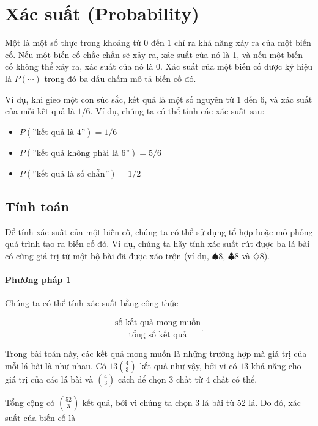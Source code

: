 \chapter{Xác suất (Probability)}


Một  là một số thực trong khoảng từ $0$ đến $1$
chỉ ra khả năng xảy ra của một biến cố.
Nếu một biến cố chắc chắn sẽ xảy ra,
xác suất của nó là 1,
và nếu một biến cố không thể xảy ra,
xác suất của nó là 0.
Xác suất của một biến cố được ký hiệu là $P(\cdots)$
trong đó ba dấu chấm mô tả biến cố đó.

Ví dụ, khi gieo một con súc sắc,
kết quả là một số nguyên từ $1$ đến $6$,
và xác suất của mỗi kết quả là $1/6$.
Ví dụ, chúng ta có thể tính các xác suất sau:

\begin{itemize}[noitemsep]
\item $P(\textrm{''kết quả là 4''})=1/6$
\item $P(\textrm{''kết quả không phải là 6''})=5/6$
\item $P(\textrm{''kết quả là số chẵn''})=1/2$
\end{itemize}

\section{Tính toán}

Để tính xác suất của một biến cố,
chúng ta có thể sử dụng tổ hợp
hoặc mô phỏng quá trình tạo ra biến cố đó.
Ví dụ, chúng ta hãy tính xác suất
rút được ba lá bài có cùng giá trị
từ một bộ bài đã được xáo trộn
(ví dụ, $\spadesuit 8$, $\clubsuit 8$ và $\diamondsuit 8$).

\subsubsection*{Phương pháp 1}

Chúng ta có thể tính xác suất bằng công thức

\[\frac{\textrm{số kết quả mong muốn}}{\textrm{tổng số kết quả}}.\]

Trong bài toán này, các kết quả mong muốn là những
trường hợp mà giá trị của mỗi lá bài là như nhau.
Có $13 {4 \choose 3}$ kết quả như vậy,
bởi vì có $13$ khả năng cho giá trị
của các lá bài và ${4 \choose 3}$ cách để
chọn $3$ chất từ $4$ chất có thể.

Tổng cộng có ${52 \choose 3}$ kết quả,
bởi vì chúng ta chọn 3 lá bài từ 52 lá.
Do đó, xác suất của biến cố là

